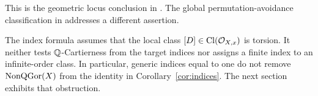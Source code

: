 This is the geometric locus conclusion in \cite[Conjecture~6.14]{WY08}\cite[Conjecture~7.39]{WY23}. The global permutation-avoidance classification in \cite{BMB07} addresses a different assertion.

\begin{remark}\label{rem:source-torsion}
The index formula assumes that the local class $[D]\in\operatorname{Cl}(\mathcal O_{X,x})$ is torsion. It neither tests $\mathbb Q$-Cartierness from the target indices nor assigns a finite index to an infinite-order class. In particular, generic indices equal to one do not remove $\operatorname{NonQGor}(X)$ from the identity in Corollary~\ref{cor:indices}. The next section exhibits that obstruction.
\end{remark}
